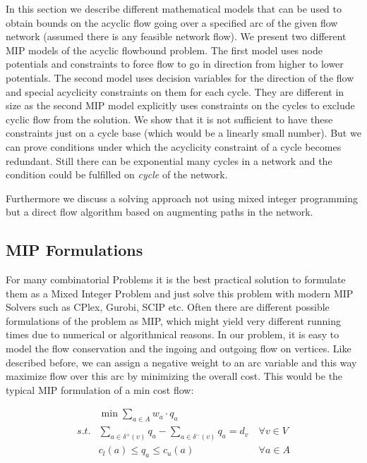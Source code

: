 In this section we describe different mathematical models that can be used to obtain bounds on the acyclic flow going 
over a specified arc of the given flow network (assumed there is any feasible network flow). We present two different 
MIP models of the acyclic flowbound problem. The first model uses node potentials and constraints to force flow to 
go in direction from higher to lower potentials. The second model uses decision variables for the direction of the 
flow and special acyclicity constraints on them for each cycle. They are different in size as the second MIP model 
explicitly uses constraints on the cycles to exclude cyclic flow from the solution. We show that it is not sufficient 
to have these constraints just on a cycle base (which would be a linearly small number). But we can prove 
conditions under which the acyclicity constraint of a cycle becomes redundant. Still there can be exponential many 
cycles in a network and the condition could be fulfilled on \textit{cycle} of the network. 

Furthermore we discuss a solving approach not using mixed integer programming but a direct flow algorithm based on 
augmenting paths in the network.%



\subsection{MIP Formulations}
For many combinatorial Problems it is the best practical solution to formulate them as a Mixed Integer Problem and just 
solve this problem with modern MIP Solvers such as CPlex, Gurobi, SCIP etc. Often there are different possible 
formulations of the problem as 
MIP, which might yield very different running times due to numerical or algorithmical reasons. In our problem, it is 
easy to model the flow conservation and the ingoing and outgoing flow on vertices. Like described before, we can assign 
a negative weight to an arc variable and this way maximize flow over this arc by minimizing the overall cost. This 
would be the typical MIP formulation of a min cost flow:

\begin{align*}
  &\min \sum_{a\in A} w_a\cdot q_a  \\
 s.t. & \sum_{a\in \delta^+(v)}q_a - \sum_{a\in\delta^- (v)}q_a = d_v\ &\forall v\in V \\
  & c_l(a)\le q_a \le c_u(a) & \forall a\in A
\end{align*}

